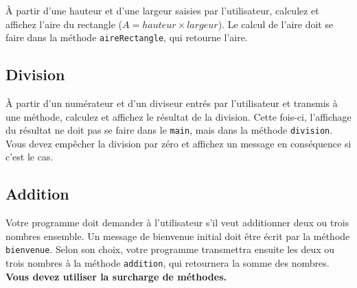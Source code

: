 \documentclass[12pt]{article}
\begin{document}
À partir d’une hauteur et d’une largeur saisies par l’utilisateur, calculez et affichez l’aire du rectangle ($A = hauteur \times largeur $). Le calcul de l’aire doit se faire dans la méthode \verb|aireRectangle|, qui retourne l’aire.

%
%
%

\subsection{Division}

À partir d’un numérateur et d’un diviseur entrés par l’utilisateur et transmis à une méthode, calculez et affichez le résultat de la division. Cette fois-ci, l’affichage du résultat ne doit pas se faire dans le \verb|main|, mais dans la méthode \verb|division|. Vous devez empêcher la division par zéro et affichez un message en conséquence si c'est le cas.

%
%
%

\subsection{Addition}

Votre programme doit demander à l’utilisateur s’il veut additionner deux ou trois nombres ensemble. Un message de bienvenue initial doit être écrit par la méthode \verb|bienvenue|. Selon son choix, votre programme transmettra ensuite les deux ou trois nombres à la méthode \verb|addition|, qui retournera la somme des nombres. \textbf{Vous devez utiliser la surcharge de méthodes.}
\end{document}
